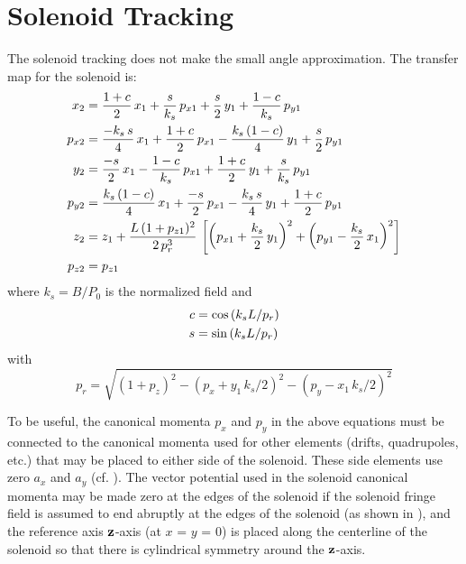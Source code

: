 \section{Solenoid Tracking}
\label{s:solenoid.std}

The  solenoid tracking does not make the small angle approximation.
The transfer map for the solenoid is:
\begin{align}
  x_2    &= \frac{1 + c}{2} \, x_1 + \frac{s}{k_s} \, p_{x1} +
           \frac{s}{2} \, y_1 + \frac{1 - c}{k_s} \, p_{y1} \nonumber \\
  p_{x2} &= \frac{-k_s \, s}{4} \, x_1 + \frac{1 + c}{2} \, p_{x1} - 
           \frac{k_s \, (1 - c)}{4} \, y_1 + \frac{s}{2} \, p_{y1} \nonumber \\
  y_2    &= \frac{-s}{2} \, x_1 - \frac{1 - c}{k_s} \, p_{x1} +
           \frac{1 + c}{2} \, y_1 + \frac{s}{k_s} \, p_{y1} \\      
  p_{y2} &= \frac{k_s \, (1 - c)}{4} \, x_1 + \frac{-s}{2} \, p_{x1} -
            \frac{k_s \, s}{4} \, y_1 + \frac{1 + c}{2} \, p_{y1} \nonumber \\ 
  z_2    &= z_1 + \frac{L \, (1 + p_{z1})^2}{2 \, p_r^3} \, 
                   \left[ \left( p_{x1} + \frac{k_s}{2} \, y_1 \right)^2 +
                          \left( p_{y1} - \frac{k_s}{2} \, x_1 \right)^2 \right] \nonumber \\
  p_{z2} &= p_{z1} \nonumber
\end{align}
where $k_s = B/P_0$ is the normalized field and
\begin{align}
  c &= \cos \left( k_s L / p_r \right) \nonumber \\
  s &= \sin \left( k_s L / p_r \right)
\end{align}
with
\begin{equation}
  p_r = \sqrt{(1 + p_z)^2 - (p_x + y_1 \, k_s/2)^2 - (p_y - x_1 \, k_s/2)^2}
\end{equation}

To be useful, the canonical momenta $p_x$ and $p_y$ in the above equations must be connected to the
canonical momenta used for other elements (drifts, quadrupoles, etc.) that may be placed to either
side of the solenoid. These side elements use zero $a_x$ and $a_y$ (cf. ). The vector
potential used in the solenoid canonical momenta may be made zero at the edges of the solenoid if
the solenoid fringe field is assumed to end abruptly at the edges of the solenoid (as shown in
), and the reference axis ${\bf z}$-axis (at $x$ = $y$ = 0) is placed along the
centerline of the solenoid so that there is cylindrical symmetry around the ${\bf z}$-axis.

